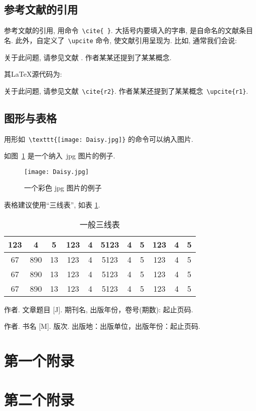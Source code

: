 \documentclass[forprint]{WHUBachelor}
\begin{document}
\section{参考文献的引用}

参考文献的引用, 用命令~\verb|\cite{ }|. 大括号内要填入的字串, 是自命名的文献条目名. 此外，自定义了~\verb|\upcite| 命令, 使文献引用呈现为. 比如, 通常我们会说:

{\kaishu
	关于此问题, 请参见文献 \cite{r2}. 作者某某还提到了某某概念.}

\noindent
其\LaTeX 源代码为:

{\kaishu
	关于此问题, 请参见文献~\verb|\cite{r2}|. 作者某某还提到了某某概念~\verb|\upcite{r1}|.
}


\section{图形与表格}

用形如~\verb|\texttt{[image: Daisy.jpg]}| 的命令可以纳入图片.

如图~\ref{fig:1} 是一个纳入~jpg 图片的例子.

\begin{figure}[ht]
	\centering
	\texttt{[image: Daisy.jpg]}
	\caption{一个彩色 jpg 图片的例子}
	\label{fig:1}
\end{figure}

表格建议使用“三线表”, 如表 \ref{tab:1}.

\begin{table}[ht]
	\centering
	\caption{一般三线表}
	\label{tab:1}
	\begin{tabular}{c c c c c c c c c c c}
		\hline
		123 & 4  & 5  & 123 & 4 & 5123 & 4 & 5 & 123 & 4 & 5\\
		\hline
		67 & 890 & 13 & 123 & 4 & 5123 & 4 & 5 & 123 & 4 & 5\\
		67 & 890 & 13 & 123 & 4 & 5123 & 4 & 5 & 123 & 4 & 5\\
		67 & 890 & 13 & 123 & 4 & 5123 & 4 & 5 & 123 & 4 & 5\\
		\hline
	\end{tabular}
\end{table}



\cleardoublepage{}
{}
\begin{thebibliography}{00}

   作者. 文章题目 [J].  期刊名, 出版年份，卷号(期数): 起止页码.

   作者. 书名 [M]. 版次. 出版地：出版单位，出版年份：起止页码.


\end{thebibliography}

 

\appendix

\chapter{第一个附录}


\chapter{第二个附录}

\cleardoublepage
\end{document}
